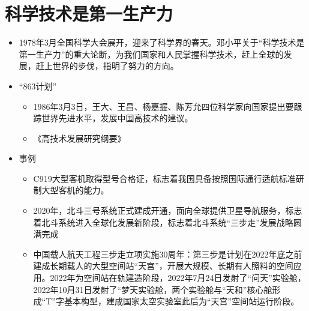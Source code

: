 \documentclass[12pt,openany]{ctexbook}
\begin{document}
\section{科学技术是第一生产力}
\begin{itemize}
  \item 1978年3月全国科学大会展开，迎来了科学界的春天。邓小平关于“科学技术是第一生产力”的重大论断，为我们国家和人民掌握科学技术，赶上全球的发展，赶上世界的步伐，指明了努力的方向。
  \item “863计划”
\begin{itemize}
  \item 1986年3月3日，王大、王昌、杨嘉握、陈芳允四位科学家向国家提出要跟踪世界先进水平，发展中国高技术的建议。
  \item 《高技术发展研究纲要》
\end{itemize}
  \item 事例
\begin{itemize}
  \item C919大型客机取得型号合格证，标志着我国具备按照国际通行适航标准研制大型客机的能力。
  \item 2020年，北斗三号系统正式建成开通，面向全球提供卫星导航服务，标志着北斗系统进入全球化发展新阶段，标志着北斗系统“三步走”发展战略圆满完成
  \item 中国载人航天工程三步走立项实施30周年：第三步是计划在2022年底之前建成长期载人的大型空间站“天宫”，开展大规模、长期有人照料的空间应用。2022年为空间站在轨建造阶段，2022年7月24日发射了“问天”实验舱，2022年10月31日发射了“梦天实验舱，两个实验舱与“天和”核心舱形成“T”字基本构型，建成国家太空实验室此后为“天宫”空间站运行阶段。
\end{itemize}
\end{itemize}
\end{document}
